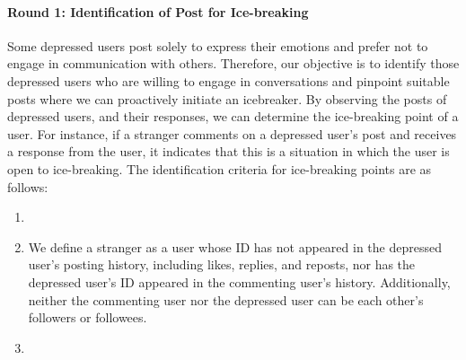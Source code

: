 \paragraph{Round 1: Identification of Post for Ice-breaking}
\label{sec:IBP}
Some depressed users post solely to express their emotions and prefer not to engage in communication with others. Therefore, our objective is to identify those depressed users who are willing to engage in conversations and pinpoint suitable posts where we can proactively initiate an icebreaker. By observing the posts of depressed users, and their responses, we can determine the 
ice-breaking point of a user. For instance, if a stranger comments on a depressed user's post and receives a response from the user, it indicates that this is a situation in which the user is open to ice-breaking.
The identification criteria for ice-breaking points are as follows:
\begin{enumerate}
    \item {}
    \item {} We define a stranger as a user whose ID has not appeared in the depressed user's posting history, including likes, replies, and reposts, nor has the depressed user's ID appeared in the commenting user's history.  Additionally, neither the commenting user nor the depressed user can be each other's followers or followees.
    \item {}
\end{enumerate}

